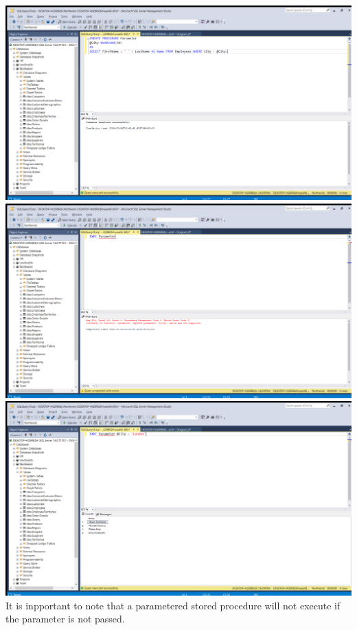 \documentclass{article}
\begin{document}
\begin{center}
    \includegraphics[width=1\textwidth]{11.png} \\
    \includegraphics[width=1\textwidth]{12.png} \\
    \includegraphics[width=1\textwidth]{13.png} \\
    It is inpportant to note that a parametered stored procedure will not execute if the parameter is not passed.
\end{center}
\end{document}

